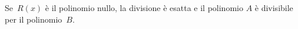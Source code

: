 
Se~\(R(x)\) è il polinomio nullo, la divisione è esatta e il polinomio 
\(A\) è divisibile per il polinomio~\(B\).

% 
%  
% 
% 

